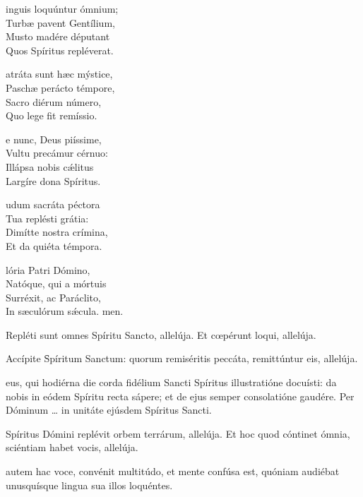 \documentclass[fontsize=9pt,paper=A6,twoside,BCOR=1mm,DIV=22,headinclude]{scrarticle}
\begin{document}
\begin{multicols}{2}
\begin{hymnus}
inguis loquúntur ómnium;\\
Turbæ pavent Gentílium,\\
Musto madére députant\\
Quos Spíritus repléverat.

atráta sunt hæc mýstice,\\
Paschæ perácto témpore,\\
Sacro diérum número,\\
Quo lege fit remíssio.

e nunc, Deus piíssime,\\
Vultu precámur cérnuo:\\
Illápsa nobis cǽlitus\\
Largíre dona Spíritus.

udum sacráta péctora\\
Tua replésti grátia:\\
Dimítte nostra crímina,\\
Et da quiéta témpora.

lória Patri Dómino,\\
Natóque, qui a mórtuis\\
Surréxit, ac Paráclito,\\
In sæculórum sǽcula.
men.
\end{hymnus}

\V Repléti sunt omnes Spíritu Sancto, allelúja.
\R Et cœpérunt loqui, allelúja.

\B Accípite \f Spíritum Sanctum: quorum remiséritis peccáta, remittúntur eis, allelúja.

{
eus, qui hodiérna die corda fidélium Sancti Spíritus illustratióne docuísti: da nobis in eódem Spíritu recta sápere; et de ejus semper consolatióne gaudére. Per Dóminum … in unitáte ejúsdem Spíritus Sancti.




\V Spíritus Dómini replévit orbem terrárum, allelúja.
\R Et hoc quod cóntinet ómnia, sciéntiam habet vocis, allelúja.

 autem hac voce, convénit multitúdo, et mente confúsa est, quóniam audiébat unusquísque lingua sua illos loquéntes.

}
\end{multicols}
\end{document}
